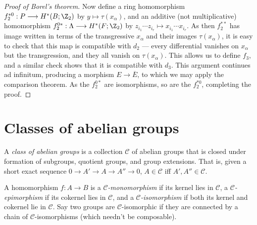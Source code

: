 \documentclass[11pt]{article}
\theoremstyle{plain}
\theoremstyle{definition}
\renewcommand{\to}{\longrightarrow}
\renewcommand{\mapsto}{\longmapsto}
\newcommand{\SerreClass}{\mathscr{C}}
\begin{document}
\begin{proof}[Proof of Borel's theorem]
Now define a ring homomorphism $f_2^{*0}:P\to H^*(B;\Z_2)$ by $y\mapsto \tau(x_\alpha)$, and an additive (not multiplicative) homomorphism $f_2^{0*}:\Lambda\to H^*(F;\Z_2)$ by $z_{i_1}\cdots z_{i_r}\mapsto x_{i_1}\cdots x_{i_r}$. As then $f_2^{**}$ has image written in terms of the transgressive $x_\alpha$ and their images $\tau(x_\alpha)$, it is easy to check that this map is compatible with $d_2$ --- every differential vanishes on $x_\alpha$ but the transgression, and they all vanish on $\tau(x_\alpha)$. This allows us to define $f_3$, and a similar check shows that it is compatible with $d_3$. This argument continues ad infinitum, producing a morphism $E\to\overline E$, to which we may apply the comparison theorem. As the $f_2^{0*}$ are isomorphisms, so are the $f_2^{*0}$, completing the proof.
%
%
\end{proof}

\section{Classes of abelian groups}
A \emph{class of abelian groups} is a collection $\SerreClass$ of abelian groups that is closed under formation of subgroups, quotient groups, and group extensions. That is, given a short exact sequence $0\to A'\to A\to A''\to0$, $A\in\SerreClass$ iff $A',A''\in\SerreClass$.

A homomorphism $f:A\to B$ is a \emph{$\SerreClass$-monomorphism} if its kernel lies in $\SerreClass$, a \emph{$\SerreClass$-epimorphism} if its cokernel lies in $\SerreClass$, and a \emph{$\SerreClass$-isomorphism} if both its kernel and cokernel lie in $\SerreClass$. Say two groups are $\SerreClass$-isomorphic if they are connected by a chain of $\SerreClass$-isomorphisms (which needn't be composable).
\end{document}

